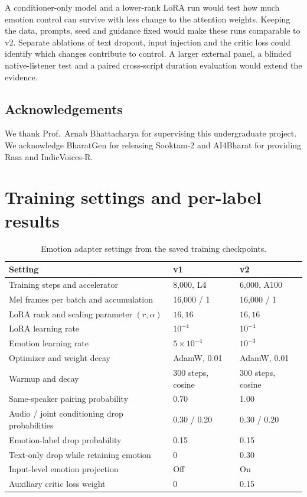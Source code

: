 \documentclass[11pt,a4paper]{article}
\begin{document}
A conditioner-only model and a lower-rank LoRA run would test how much emotion control can survive with less change to the attention weights. Keeping the data, prompts, seed and guidance fixed would make these runs comparable to v2. Separate ablations of text dropout, input injection and the critic loss could identify which changes contribute to control. A larger external panel, a blinded native-listener test and a paired cross-script duration evaluation would extend the evidence.

\subsection*{Acknowledgements}
We thank Prof.\ Arnab Bhattacharya for supervising this undergraduate project. We acknowledge BharatGen for releasing Sooktam-2 and AI4Bharat for providing Rasa and IndicVoices-R.

\clearpage
\appendix
\section{Training settings and per-label results}
\label{app:settings}

\begin{table}[!h]
\centering
\caption{Emotion adapter settings from the saved training checkpoints.}
{\small
\begin{tabularx}{\linewidth}{@{}Xll@{}}
\toprule
Setting & v1 & v2 \\
\midrule
Training steps and accelerator & 8,000, L4 & 6,000, A100 \\
Mel frames per batch and accumulation & 16,000 / 1 & 16,000 / 1 \\
LoRA rank and scaling parameter \((r,\alpha)\) & \(16,16\) & \(16,16\) \\
LoRA learning rate & \(10^{-4}\) & \(10^{-4}\) \\
Emotion learning rate & \(5\times10^{-4}\) & \(10^{-3}\) \\
Optimizer and weight decay & AdamW, 0.01 & AdamW, 0.01 \\
Warmup and decay & 300 steps, cosine & 300 steps, cosine \\
Same-speaker pairing probability & 0.70 & 1.00 \\
Audio / joint conditioning drop probabilities & 0.30 / 0.20 & 0.30 / 0.20 \\
Emotion-label drop probability & 0.15 & 0.15 \\
Text-only drop while retaining emotion & 0 & 0.30 \\
Input-level emotion projection & Off & On \\
Auxiliary critic loss weight & 0 & 0.15 \\
\bottomrule
\end{tabularx}}
\end{table}
\end{document}
